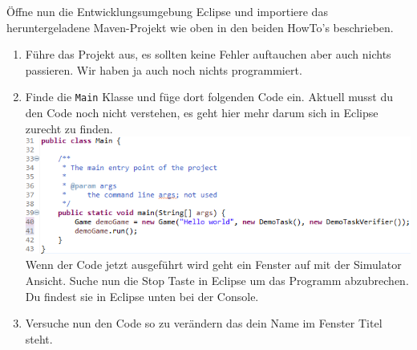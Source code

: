 \newpage

Öffne nun die Entwicklungsumgebung Eclipse und importiere das heruntergeladene Maven-Projekt \jvkpackage wie oben in den beiden HowTo's beschrieben.

\begin{enumerate}[label=\alph*)]
    \item Führe das Projekt aus, es sollten keine Fehler auftauchen aber auch nichts passieren.
    Wir haben ja auch noch nichts programmiert.
    \item Finde die \texttt{Main} Klasse und füge dort folgenden Code ein.
    Aktuell musst du den Code noch nicht verstehen, es geht hier mehr darum sich in Eclipse zurecht zu finden.\\
    \includegraphics[width=\linewidth]{./figures/code.1.png}\\
    Wenn der Code jetzt ausgeführt wird geht ein Fenster auf mit der Simulator Ansicht.
    Suche nun die Stop Taste in Eclipse um das Programm abzubrechen.
    Du findest sie in Eclipse unten bei der Console.
    \item Versuche nun den Code so zu verändern das dein Name im Fenster Titel steht.
\end{enumerate}

